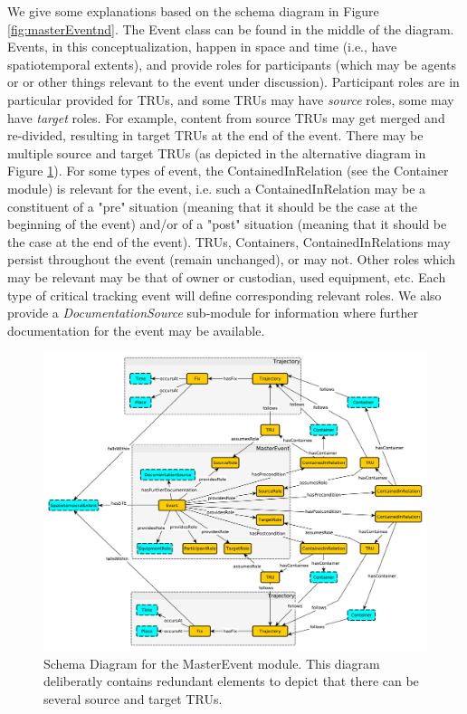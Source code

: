 We give some explanations based on the schema diagram in Figure \ref{fig:masterEventnd}. The Event class can be found in the middle of the diagram. Events, in this conceptualization, happen in space and time (i.e., have spatiotemporal extents), and provide roles for participants (which may be agents or or other things relevant to the event under discussion). Participant roles are in particular provided for TRUs, and some TRUs may have \emph{source} roles, some may have \emph{target} roles. For example, content from source TRUs may get merged and re-divided, resulting in target TRUs at the end of the event. There may be multiple source and target TRUs (as depicted in the alternative diagram in Figure \ref{fig:masterEvent}). For some types of event, the ContainedInRelation (see the Container module) is relevant for the event, i.e. such a ContainedInRelation may be a constituent of a "pre" situation (meaning that it should be the case at the beginning of the event) and/or of a "post" situation (meaning that it should be the case at the end of the event).  TRUs, Containers, ContainedInRelations may persist throughout the event (remain unchanged), or may not. Other roles which may be relevant may be that of owner or custodian, used equipment, etc. Each type of critical tracking event will define corresponding relevant roles. We also provide a \emph{DocumentationSource} sub-module for information where further documentation for the event may be available.

\begin{figure}[tb]
\begin{center}
\includegraphics[width=\textwidth]{diagrams/master_event}
\end{center}
\caption[Alternative Schema Diagram for the MasterEvent module]{Schema Diagram for the MasterEvent module. This diagram deliberatly contains redundant elements to depict that there can be several source and target TRUs.}
\label{fig:masterEvent}
\end{figure}

